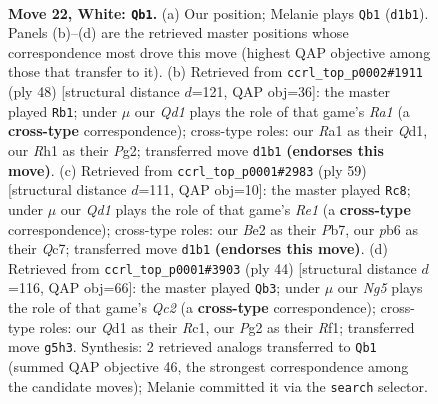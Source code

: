 \documentclass[11pt]{article}
\begin{document}
\clearpage

\begin{figure}[p]\centering
\begin{subfigure}{0.46\textwidth}\centering
\resizebox{\linewidth}{!}{%
\newchessgame
\chessboard[
  setfen={rn1r4/3nk3/1p2p3/pPq1PpN1/5P1p/8/P2KB1PP/R2Q3R w - - 1 22},
  showmover=false,
  pgfstyle=straightmove, color=movearrow, markmove={d1-b1}
]}
\caption{}
\end{subfigure}\hfill
\begin{subfigure}{0.46\textwidth}\centering
\resizebox{\linewidth}{!}{%
\newchessgame
\chessboard[
  setfen={1r2k2r/p1q1np2/2n1p2p/2PpP1p1/1P1N4/2B1R3/5PPP/R2Q2K1 w k - 3 25},
  showmover=false,
  pgfstyle=straightmove, color=movearrow, markmove={a1-b1}
]}
\caption{}
\end{subfigure}
\\[4pt]
\begin{subfigure}{0.46\textwidth}\centering
\resizebox{\linewidth}{!}{%
\newchessgame
\chessboard[
  setfen={4r1k1/ppq1bp2/4n1p1/P2pP2p/1P6/3R1NP1/2rN1P1P/Q2R2K1 b - - 2 30},
  showmover=false,
  pgfstyle=straightmove, color=movearrow, markmove={e8-c8}
]}
\caption{}
\end{subfigure}\hfill
\begin{subfigure}{0.46\textwidth}\centering
\resizebox{\linewidth}{!}{%
\newchessgame
\chessboard[
  setfen={1k1r2nr/ppn3p1/2p2p2/3p1BP1/N2P3P/4P1q1/PPQ5/1KR2R2 w - - 4 23},
  showmover=false,
  pgfstyle=straightmove, color=movearrow, markmove={c2-b3}
]}
\caption{}
\end{subfigure}
\caption{\textbf{Move 22, White: \texttt{Qb1}.} (a) Our position; Melanie plays \texttt{Qb1} (\texttt{d1b1}). Panels (b)--(d) are the retrieved master positions whose correspondence most drove this move (highest QAP objective among those that transfer to it). (b) Retrieved from \texttt{ccrl\_top\_p0002\#1911} (ply 48) [structural distance $d$=121, QAP obj=36]: the master played \texttt{Rb1}; under $\mu$ our \emph{Qd1} plays the role of that game's \emph{Ra1} (a \textbf{cross-type} correspondence); cross-type roles: our \emph{R}a1 as their \emph{Q}d1, our \emph{R}h1 as their \emph{P}g2; transferred move \texttt{d1b1} \textbf{(endorses this move)}. (c) Retrieved from \texttt{ccrl\_top\_p0001\#2983} (ply 59) [structural distance $d$=111, QAP obj=10]: the master played \texttt{Rc8}; under $\mu$ our \emph{Qd1} plays the role of that game's \emph{Re1} (a \textbf{cross-type} correspondence); cross-type roles: our \emph{B}e2 as their \emph{P}b7, our \emph{p}b6 as their \emph{Q}c7; transferred move \texttt{d1b1} \textbf{(endorses this move)}. (d) Retrieved from \texttt{ccrl\_top\_p0001\#3903} (ply 44) [structural distance $d$=116, QAP obj=66]: the master played \texttt{Qb3}; under $\mu$ our \emph{Ng5} plays the role of that game's \emph{Qc2} (a \textbf{cross-type} correspondence); cross-type roles: our \emph{Q}d1 as their \emph{R}c1, our \emph{P}g2 as their \emph{R}f1; transferred move \texttt{g5h3}. Synthesis: 2 retrieved analogs transferred to \texttt{Qb1} (summed QAP objective 46, the strongest correspondence among the candidate moves); Melanie committed it via the \texttt{search} selector.}
\label{fig:thought-m42}
\end{figure}
\end{document}
